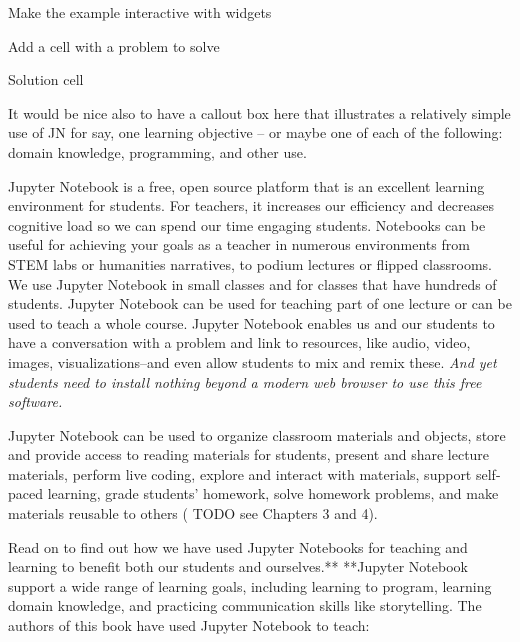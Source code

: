 \documentclass[]{book}
\begin{document}
Make the example interactive with widgets

Add a cell with a problem to solve

Solution cell

It would be nice also to have a callout box here that illustrates a
relatively simple use of JN for say, one learning objective -- or maybe
one of each of the following: domain knowledge, programming, and other
use.

Jupyter Notebook is a free, open source platform that is an excellent
learning environment for students. For teachers, it increases our
efficiency and decreases cognitive load so we can spend our time
engaging students. Notebooks can be useful for achieving your goals as a
teacher in numerous environments from STEM labs or humanities
narratives, to podium lectures or flipped classrooms. We use Jupyter
Notebook in small classes and for classes that have hundreds of
students. Jupyter Notebook can be used for teaching part of one lecture
or can be used to teach a whole course. Jupyter Notebook enables us and
our students to have a conversation with a problem and link to
resources, like audio, video, images, visualizations--and even allow
students to mix and remix these. \emph{And yet students need to install
nothing beyond a modern web browser to use this free software.}

Jupyter Notebook can be used to organize classroom materials and
objects, store and provide access to reading materials for students,
present and share lecture materials, perform live coding, explore and
interact with materials, support self-paced learning, grade students'
homework, solve homework problems, and make materials reusable to others
( TODO see Chapters 3 and 4).

Read on to find out how we have used Jupyter Notebooks for teaching and
learning to benefit both our students and ourselves.** **Jupyter
Notebook support a wide range of learning goals, including learning to
program, learning domain knowledge, and practicing communication skills
like storytelling. The authors of this book have used Jupyter Notebook
to teach:
\end{document}
